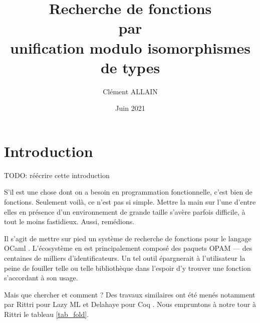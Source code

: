 \documentclass[a4paper]{report}
\title{Recherche de fonctions \\ par \\ unification modulo isomorphismes de types}
\author{Clément ALLAIN}
\date{Juin 2021}
\theoremstyle{definition}
\begin{document}
\maketitle

\tableofcontents

\newpage


\chapter{Introduction}

TODO: réécrire cette introduction

S'il est une chose dont on a besoin en programmation fonctionnelle, c'est bien de fonctions. Seulement voilà, ce n'est pas si simple. Mettre la main sur l'une d'entre elles en présence d'un environnement de grande taille s'avère parfois difficile, à tout le moins fastidieux. Aussi, remédions.

Il s'agit de mettre sur pied un système de recherche de fonctions pour le langage OCaml \cite{OCaml}. L'écosystème en est principalement composé des paquets OPAM --- des centaines de milliers d'identificateurs. Un tel outil épargnerait à l'utilisateur la peine de fouiller telle ou telle bibliothèque dans l'espoir d'y trouver une fonction s'accordant à son usage.

Mais que chercher et comment ? Des travaux similaires ont été menés notamment par Rittri pour Lazy ML \cite{Rittri91, Rittri93} et Delahaye pour Coq \cite{Delahaye}. Nous empruntons à notre tour à Rittri \cite{Rittri91} le tableau \ref{tab_fold}.
\end{document}
